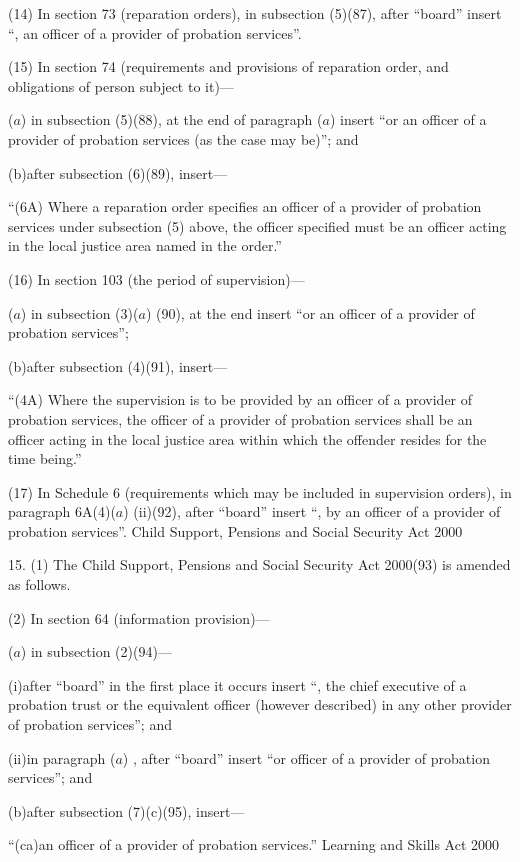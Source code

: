 \documentclass[12pt,a4paper]{article}
\begin{document}
(14) In section 73 (reparation orders), in subsection (5)(87), after “board” insert “, an officer of a provider of probation services”.

(15) In section 74 (requirements and provisions of reparation order, and obligations of person subject to it)—

($a$) in subsection (5)(88), at the end of paragraph ($a$)  insert “or an officer of a provider of probation services (as the case may be)”; and

(b)after subsection (6)(89), insert—

“(6A) Where a reparation order specifies an officer of a provider of probation services under subsection (5) above, the officer specified must be an officer acting in the local justice area named in the order.”

(16) In section 103 (the period of supervision)—

($a$) in subsection (3)($a$) (90), at the end insert “or an officer of a provider of probation services”;

(b)after subsection (4)(91), insert—

“(4A) Where the supervision is to be provided by an officer of a provider of probation services, the officer of a provider of probation services shall be an officer acting in the local justice area within which the offender resides for the time being.”

(17) In Schedule 6 (requirements which may be included in supervision orders), in paragraph 6A(4)($a$) (ii)(92), after “board” insert “, by an officer of a provider of probation services”.
Child Support, Pensions and Social Security Act 2000

15.  (1)  The Child Support, Pensions and Social Security Act 2000(93) is amended as follows.

(2) In section 64 (information provision)—

($a$) in subsection (2)(94)—

(i)after “board” in the first place it occurs insert “, the chief executive of a probation trust or the equivalent officer (however described) in any other provider of probation services”; and

(ii)in paragraph ($a$) , after “board” insert “or officer of a provider of probation services”; and

(b)after subsection (7)(c)(95), insert—

“(ca)an officer of a provider of probation services.”
Learning and Skills Act 2000
\end{document}
